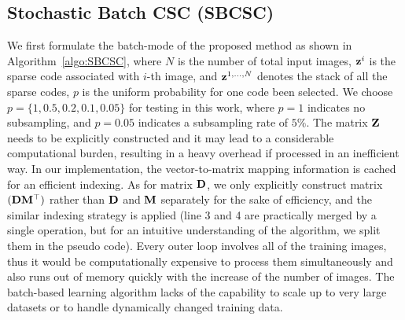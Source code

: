 \subsection{Stochastic Batch CSC (SBCSC)}
We first formulate the batch-mode of the proposed method as shown in Algorithm~\ref{algo:SBCSC}, where $N$ is the number of total input images, $\code^i$ is the sparse code associated with $i$-th image, and $\code^{1,\dots,N}$ denotes the stack of all the sparse codes, $p$ is the uniform probability for one code been selected. We choose $p=\{1, 0.5, 0.2, 0.1, 0.05\}$ for testing in this work, where $p=1$ indicates no subsampling, and $p=0.05$ indicates a subsampling rate of $5\%$. The matrix $\Code$ needs to be explicitly constructed and it may lead to a considerable computational burden, resulting in a heavy overhead if processed in an inefficient way. In our implementation, the vector-to-matrix mapping information is cached for an efficient indexing. As for matrix $\Filter$, we only explicitly construct matrix $(\Filter \mask^\top)$ rather than $\Filter$ and $\mask$ separately for the sake of efficiency, and the similar indexing strategy is applied (line 3 and 4 are practically merged by a single operation, but for an intuitive understanding of the algorithm, we split them in the pseudo code). Every outer loop involves all of the training images, thus it would be computationally expensive to process them simultaneously and also runs out of memory quickly with the increase of the number of images. The batch-based learning algorithm lacks of the capability to scale up to very large datasets or to handle dynamically changed training data.

